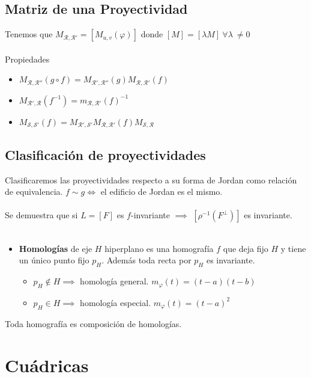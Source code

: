\documentclass{myclass}
\begin{document}
\subsection{Matriz de una Proyectividad}
Tenemos que $M_{\mathcal{R}, \mathcal{R}'} = [M_{u, v}(\varphi )]$ donde $[M] = [\lambda M]\ \forall \lambda\ \neq 0$ \\
\\
Propiedades
\begin{itemize}
  \item $M_{\mathcal{R}, \mathcal{R}''}(g\circ f)=M_{\mathcal{R}', \mathcal{R}''}(g)M_{\mathcal{R}, \mathcal{R}'}(f)$
  \item $M_{\mathcal{R}', \mathcal{R}}(f^{-1}) = m_{\mathcal{R}, \mathcal{R}'}(f)^{-1}$ 
  \item $M_{\mathcal{S}, \mathcal{S}'}(f) = M_{\mathcal{R}', \mathcal{S}'}M_{\mathcal{R}, \mathcal{R}'}(f) M_{\mathcal{S}, \mathcal{R}}$
\end{itemize}

\subsection{Clasificación de proyectividades}
Clasificaremos las proyectividades respecto a su forma de Jordan como relación de equivalencia. $f\sim g \iff$
el edificio de Jordan es el mismo. \\
\\
Se demuestra que si $L = [F]$ es $f$-invariante $\implies$ $[\rho^{-1}(F^\perp)]$ es invariante.\\
\\
\begin{itemize}
  \item \textbf{Homologías} de eje $H$ hiperplano es una homografía  $f$ que deja fijo  $H$ y tiene un único punto fijo $p_H$. Además toda recta por $p_H$ es invariante.
	 \begin{itemize}
	  \item $p_H\notin H \implies$ homología general. $m_\varphi(t) = (t-a)(t-b)$
	  \item $p_H\in H \implies$ homología especial. $m_\varphi (t) = (t-a)^2$
	\end{itemize}
\end{itemize}

Toda homografía es composición de homologías.




\section{Cuádricas}
\end{document}
